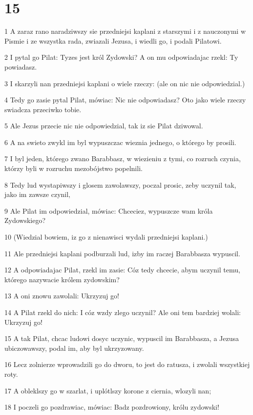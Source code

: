 \chapter{15}

\par 1 A zaraz rano naradziwszy sie przedniejsi kaplani z starszymi i z nauczonymi w Pismie i ze wszystka rada, zwiazali Jezusa, i wiedli go, i podali Pilatowi.
\par 2 I pytal go Pilat: Tyzes jest król Zydowski? A on mu odpowiadajac rzekl: Ty powiadasz.
\par 3 I skarzyli nan przedniejsi kaplani o wiele rzeczy: (ale on nic nie odpowiedzial.)
\par 4 Tedy go zasie pytal Pilat, mówiac: Nic nie odpowiadasz? Oto jako wiele rzeczy swiadcza przeciwko tobie.
\par 5 Ale Jezus przecie nic nie odpowiedzial, tak iz sie Pilat dziwowal.
\par 6 A na swieto zwykl im byl wypuszczac wieznia jednego, o którego by prosili.
\par 7 I byl jeden, którego zwano Barabbasz, w wiezieniu z tymi, co rozruch czynia, którzy byli w rozruchu mezobójstwo popelnili.
\par 8 Tedy lud wystapiwszy i glosem zawolawszy, poczal prosic, zeby uczynil tak, jako im zawsze czynil,
\par 9 Ale Pilat im odpowiedzial, mówiac: Chceciez, wypuszcze wam króla Zydowskiego?
\par 10 (Wiedzial bowiem, iz go z nienawisci wydali przedniejsi kaplani.)
\par 11 Ale przedniejsi kaplani podburzali lud, izby im raczej Barabbasza wypuscil.
\par 12 A odpowiadajac Pilat, rzekl im zasie: Cóz tedy chcecie, abym uczynil temu, którego nazywacie królem zydowskim?
\par 13 A oni znowu zawolali: Ukrzyzuj go!
\par 14 A Pilat rzekl do nich: I cóz wzdy zlego uczynil? Ale oni tem bardziej wolali: Ukrzyzuj go!
\par 15 A tak Pilat, chcac ludowi dosyc uczynic, wypuscil im Barabbasza, a Jezusa ubiczowawszy, podal im, aby byl ukrzyzowany.
\par 16 Lecz zolnierze wprowadzili go do dworu, to jest do ratusza, i zwolali wszystkiej roty.
\par 17 A obleklszy go w szarlat, i uplótlszy korone z ciernia, wlozyli nan;
\par 18 I poczeli go pozdrawiac, mówiac: Badz pozdrowiony, królu zydowski!
